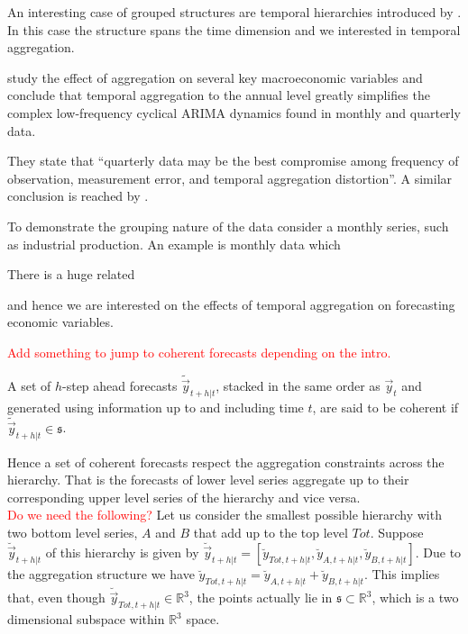 \documentclass[graybox]{svmult}
\begin{document}
An interesting case of grouped structures are temporal hierarchies introduced by \cite{AthEtAl2017}. In this case the structure spans the time dimension and we interested in temporal aggregation. 

\cite{RosSea1995} study the effect of aggregation on several key macroeconomic variables and conclude that temporal aggregation to the annual level greatly simplifies the complex low-frequency cyclical ARIMA dynamics found in monthly and quarterly data. 

They state that ``quarterly data may be the best compromise among frequency of observation, measurement error, and temporal aggregation distortion''. A similar conclusion is reached by \cite{NijPal1990}.


To demonstrate the grouping nature of the data consider a monthly series, such as industrial production. An example is monthly data which

There is a huge related 

\citet{AmeWu1972, Tia1972, Bre1973, Wei1979, RosSea1995, SilVer2008}


 and hence we are interested on the effects of temporal aggregation on forecasting economic variables.




\textcolor{red}{Add something to jump to coherent forecasts depending on the intro.}

\begin{definition}
A set of $h$-step ahead forecasts $\tilde{\vec{y}}_{t+h|t}$, stacked in the same order as $\vec{y}_{t}$ and generated using information up to and including time $t$,
are said to be coherent if $\tilde{\vec{y}}_{t+h|t} \in \mathfrak{s}$.
  \label{def:coherence}
\end{definition}

Hence a set of coherent forecasts respect the aggregation constraints across the hierarchy. That is the forecasts of lower level series aggregate up to their corresponding upper level series of the hierarchy and vice versa.
\\

\textcolor{red}{Do we need the following?}
Let us consider the smallest possible hierarchy with two bottom level series, $A$ and $B$ that add up to the top level $Tot$. Suppose $\breve{\vec{y}}_{t+h|t}$ of this hierarchy is given by $\breve{\vec{y}}_{t+h|t} = [\breve{y}_{Tot,t+h|t},\breve{y}_{A,t+h|t}, \breve{y}_{B,t+h|t}]$. Due to the aggregation structure we have $\breve{y}_{Tot,t+h|t}=\breve{y}_{A,t+h|t}+\breve{y}_{B,t+h|t}$. This implies that, even though  $\breve{\vec{y}}_{Tot,t+h|t} \in \mathbb{R}^3$, the points actually lie in $\mathfrak{s}\subset \mathbb{R}^3$, which is a two dimensional subspace within $\mathbb{R}^3$ space.
\end{document}
